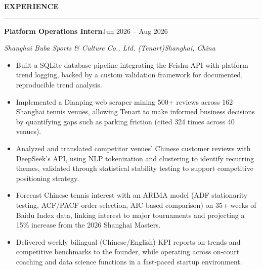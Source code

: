 \documentclass[letterpaper,10pt]{article}
\newcommand{\resumeSection}[1]{%
  \vspace{3pt}%
  {\large\bfseries #1}\par
  \vspace{-4pt}\rule{\linewidth}{0.4pt}\par
  \vspace{1pt}%
}
\newcommand{\entry}[4]{%
  {\large\bfseries #1}\hfill #2\par
  \textit{#3}\hfill \textit{#4}\par
}
\newenvironment{bullets}{\begin{itemize}}{\end{itemize}\vspace{1pt}}
\begin{document}
\resumeSection{EXPERIENCE}
\entry{Platform Operations Intern}{Jun 2026 -- Aug 2026}
      {Shanghai Buba Sports \& Culture Co., Ltd. (Tenart)}{Shanghai, China}
\begin{bullets}
  \item Built a SQLite database pipeline integrating the Feishu API with platform trend logging, backed by a custom validation framework for documented, reproducible trend analysis.
  \item Implemented a Dianping web scraper mining 500+ reviews across 162 Shanghai tennis venues, allowing Tenart to make informed business decisions by quantifying gaps such as parking friction (cited 324 times across 40 venues).
  \item Analyzed and translated competitor venues' Chinese customer reviews with DeepSeek's API, using NLP tokenization and clustering to identify recurring themes, validated through statistical stability testing to support competitive positioning strategy.
  \item Forecast Chinese tennis interest with an ARIMA model (ADF stationarity testing, ACF/PACF order selection, AIC-based comparison) on 35+ weeks of Baidu Index data, linking interest to major tournaments and projecting a 15\% increase from the 2026 Shanghai Masters.
  \item Delivered weekly bilingual (Chinese/English) KPI reports on trends and competitive benchmarks to the founder, while operating across on-court coaching and data science functions in a fast-paced startup environment.
\end{bullets}
\end{document}
